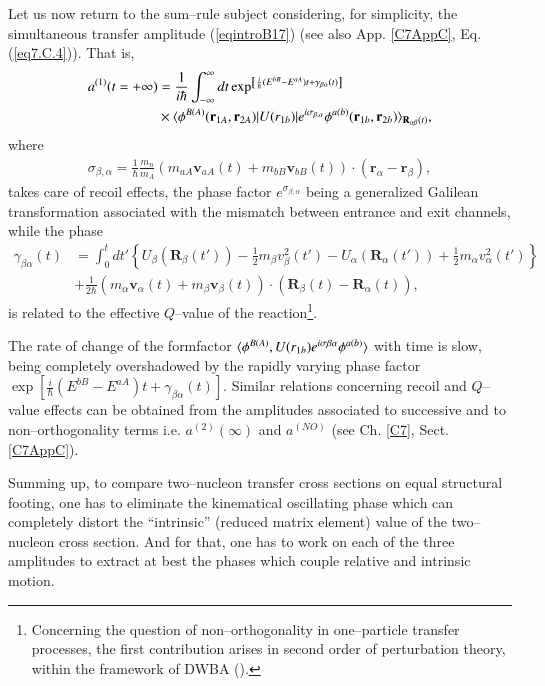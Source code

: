 Let us now return to the sum--rule subject considering,  for simplicity, the simultaneous transfer amplitude (\ref{eqintroB17}) (see also App. \ref{C7AppC}, Eq. (\ref{eq7.C.4})). That is,
\begin{align}\label{eqintroB19}
\nonumber a^{(1)}(t=+\infty)&=\frac{1}{i\hbar}\int^{\infty}_{-\infty}dt\exp^{\left[\frac{i}{\hbar}(E^{bB}-E^{aA})t+\gamma_{\beta\alpha}(t)\right]}\\
&\times\langle {\phi^{B(A)}(\mathbf r_{1A},\mathbf r_{2A})|U(r_{1b})|e^{i\sigma_{\beta,\alpha}}\phi^{a(b)}(\mathbf r_{1b},\mathbf r_{2b})} \rangle_{\mathbf R_{\alpha\beta}(t)},
\end{align}
where
\begin{align}
\sigma_{\beta,\alpha}=\frac{1}{\hbar}\frac{m_n}{m_A}(m_{aA}\mathbf v_{aA}(t)+m_{bB}\mathbf v_{bB}(t))\cdot(\mathbf r_\alpha-\mathbf r_\beta),
\end{align}
takes care of recoil effects, the phase factor $e^{\sigma_{\beta,\alpha}}$ being a generalized Galilean transformation associated with the mismatch between entrance and exit channels,  while the phase
\begin{align}\label{eqintroB21}
\nonumber\gamma_{\beta\alpha}(t)&=\int^t_0 dt'\left\{U_\beta(\mathbf R_{\beta}(t'))-\frac{1}{2}m_\beta v_\beta^2(t')-U_\alpha(\mathbf R_\alpha(t'))+\frac{1}{2}m_\alpha v_\alpha^2(t')\right\}\\
&+\frac{1}{2\hbar}\left(m_\alpha \mathbf v_\alpha(t)+m_\beta \mathbf v_\beta(t) \right)\cdot(\mathbf R_\beta(t)-\mathbf R_\alpha(t)),
\end{align}
is related to the effective $Q$--value of the reaction\footnote{Concerning the question of non--orthogonality in one--particle transfer processes, the first contribution arises in second order of perturbation theory, within the framework of DWBA (\cite{Thompson:09}).}.


The rate of change of the formfactor $\langle {\phi^{B(A)},U(r_{1b})e^{i\sigma{\beta\alpha}}\phi^{a(b)}} \rangle$ with time is slow, being completely overshadowed by the rapidly varying phase factor\\ $\exp\left[\frac{i}{\hbar}(E^{bB}-E^{aA})t+\gamma_{\beta\alpha}(t)\right]$. Similar relations concerning recoil and $Q$--value effects can be obtained from the amplitudes associated to successive and to non--orthogonality terms i.e. $a^{(2)}(\infty)$ and $a^{(NO)}$ (see Ch. \ref{C7}, Sect. \ref{C7AppC}).


Summing up, to compare two--nucleon transfer cross sections on equal structural footing, one has to eliminate the kinematical oscillating phase which can completely distort the ``intrinsic'' (reduced matrix element) value of the two--nucleon cross section. And for that, one has to work on each of the three amplitudes to extract at best the phases which couple relative and intrinsic motion.



